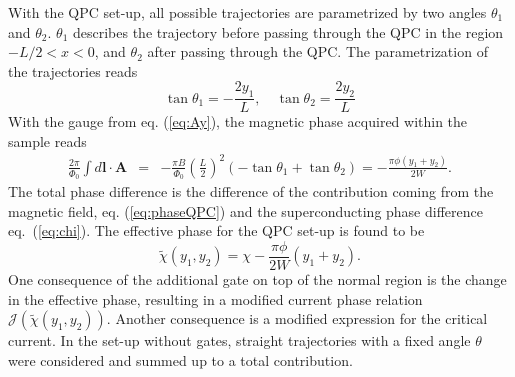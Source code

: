 With the QPC set-up, all possible trajectories are parametrized by two angles $\theta_1$ and $\theta_2$. $\theta_1$ describes the trajectory before passing through the QPC in the region $ -L/2 < x < 0$, and  $\theta_2$ after passing through the QPC. The parametrization of the trajectories reads
\begin{equation}
\tan \theta_1 = - \frac{2 y_1}{L}, \quad \tan \theta_2 = \frac{2 y_2}{L}
\label{eq:QPCparametrization}
\end{equation}
With the gauge from eq. (\ref{eq:Ay}), the magnetic phase acquired within the sample reads
\begin{eqnarray}
\frac{2\pi}{\Phi_0} \int d\mathbf{l} \cdot \mathbf{A}  &=&
-\frac{\pi B}{\Phi_0}\left(\frac{L}{2}\right)^2
\left(-\tan\theta_1 + \tan\theta_2\right) =
-\frac{\pi \phi (y_1+y_2)}{2 W}.
\label{eq:phaseQPC}
\end{eqnarray}
The total phase difference is the difference of the contribution coming from the magnetic field, eq. (\ref{eq:phaseQPC}) and the superconducting phase difference eq.~(\ref{eq:chi}). The effective phase for the QPC set-up is found to be
\begin{equation}
\tilde{\chi}(y_1,y_2)=\chi-\frac{ \pi \phi }{2W}(y_1+y_2).
\label{eq:chiQPC}
\end{equation}
One consequence of the additional gate on top of the normal region is the change in the effective phase, resulting in a modified current phase relation $\mathcal{J}(\tilde{\chi}(y_1, y_2))$. Another consequence is a modified expression for the critical current. In the set-up without gates, straight trajectories with a fixed angle $\theta$ were considered and summed up to a total contribution.

